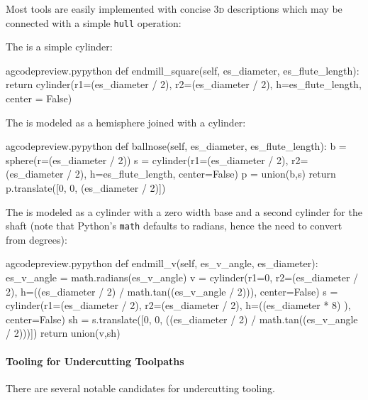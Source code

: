 \documentclass{ltxdoc}
\begin{document}
Most tools are easily implemented with concise \textsc{3d} descriptions which may be connected with a simple \texttt{hull} operation:

The  is a simple cylinder:

\lstset{firstnumber=\thegcpy}
\begin{writecode}{a}{gcodepreview.py}{python}
    def endmill_square(self, es_diameter, es_flute_length):
        return cylinder(r1=(es_diameter / 2), r2=(es_diameter / 2), h=es_flute_length, center = False)

\end{writecode}
\addtocounter{gcpy}{3}

The  is modeled as a hemisphere joined with a cylinder:

\lstset{firstnumber=\thegcpy}
\begin{writecode}{a}{gcodepreview.py}{python}
    def ballnose(self, es_diameter, es_flute_length):
        b = sphere(r=(es_diameter / 2))
        s = cylinder(r1=(es_diameter / 2), r2=(es_diameter / 2), h=es_flute_length, center=False)
        p = union(b,s)
        return p.translate([0, 0, (es_diameter / 2)])

\end{writecode}
\addtocounter{gcpy}{6}

The  is modeled as a cylinder with a zero width base and a second cylinder for the shaft (note that Python's \verb|math| defaults to radians, hence the need to convert from degrees):

\lstset{firstnumber=\thegcpy}
\begin{writecode}{a}{gcodepreview.py}{python}
    def endmill_v(self, es_v_angle, es_diameter):
        es_v_angle = math.radians(es_v_angle)
        v = cylinder(r1=0, r2=(es_diameter / 2), h=((es_diameter / 2) / math.tan((es_v_angle / 2))), center=False)
        s = cylinder(r1=(es_diameter / 2), r2=(es_diameter / 2), h=((es_diameter * 8) ), center=False)
        sh = s.translate([0, 0, ((es_diameter / 2) / math.tan((es_v_angle / 2)))])
        return union(v,sh)

\end{writecode}
\addtocounter{gcpy}{7}

\paragraph{Tooling for Undercutting Toolpaths}

There are several notable candidates for undercutting tooling. \label{para:undercuttooling} 
\end{document}
